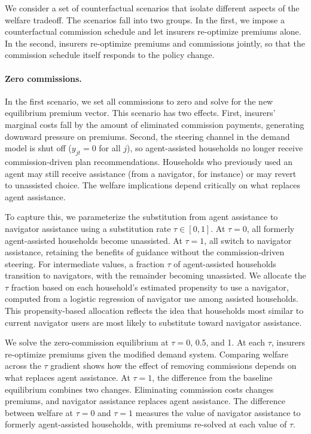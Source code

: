 \documentclass[12pt]{article}
\begin{document}
We consider a set of counterfactual scenarios that isolate different aspects of the welfare tradeoff. The scenarios fall into two groups. In the first, we impose a counterfactual commission schedule and let insurers re-optimize premiums alone. In the second, insurers re-optimize premiums and commissions jointly, so that the commission schedule itself responds to the policy change.

\paragraph{Zero commissions.} In the first scenario, we set all commissions to zero and solve for the new equilibrium premium vector. This scenario has two effects. First, insurers' marginal costs fall by the amount of eliminated commission payments, generating downward pressure on premiums. Second, the steering channel in the demand model is shut off ($y_{jt} = 0$ for all $j$), so agent-assisted households no longer receive commission-driven plan recommendations. Households who previously used an agent may still receive assistance (from a navigator, for instance) or may revert to unassisted choice. The welfare implications depend critically on what replaces agent assistance.

To capture this, we parameterize the substitution from agent assistance to navigator assistance using a substitution rate $\tau \in [0, 1]$. At $\tau = 0$, all formerly agent-assisted households become unassisted. At $\tau = 1$, all switch to navigator assistance, retaining the benefits of guidance without the commission-driven steering. For intermediate values, a fraction $\tau$ of agent-assisted households transition to navigators, with the remainder becoming unassisted. We allocate the $\tau$ fraction based on each household's estimated propensity to use a navigator, computed from a logistic regression of navigator use among assisted households. This propensity-based allocation reflects the idea that households most similar to current navigator users are most likely to substitute toward navigator assistance.

We solve the zero-commission equilibrium at $\tau = 0$, 0.5, and 1. At each $\tau$, insurers re-optimize premiums given the modified demand system. Comparing welfare across the $\tau$ gradient shows how the effect of removing commissions depends on what replaces agent assistance. At $\tau = 1$, the difference from the baseline equilibrium combines two changes. Eliminating commission costs changes premiums, and navigator assistance replaces agent assistance. The difference between welfare at $\tau = 0$ and $\tau = 1$ measures the value of navigator assistance to formerly agent-assisted households, with premiums re-solved at each value of $\tau$.
\end{document}
